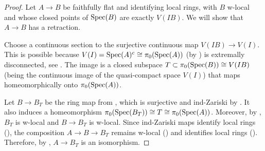 \begin{proof}
  Let $A \to B$ be faithfully flat and identifying local rings, with \(B\) w-local and whose closed points of \(\operatorname{Spec} (B)\) are exactly \(V(IB)\). We will show that $A \to B$ has a retraction.


  Choose a continuous section to the surjective continuous map $V(IB) \to V(I)$. This is possible because $V(I) = \operatorname{Spec}(A)^c \cong \pi_0(\operatorname{Spec}(A))$ (by ) is extremally disconnected, see . The image is a closed subspace $T \subset \pi_0(\operatorname{Spec}(B)) \cong V(IB)$ (being the continuous image of the quasi-compact space $V(I)$) that maps homeomorphically onto $\pi_0(\operatorname{Spec}(A))$. 
  
  Let $B \to B_T$ be the ring map from , which is surjective and ind-Zariski by . It also induces a homeomorphism $\pi_0(\operatorname{Spec}(B_T)) \cong T \cong \pi_0(\operatorname{Spec}(A))$.
  Moreover, by , $B_T$ is w-local and $B \to B_T$ is w-local. Since ind-Zariski maps identify local rings (), the composition $A \to B \to B_T$ remains w-local () and identifies local rings (). Therefore, by , $A \to B_T$ is an isomorphism.
\end{proof}

